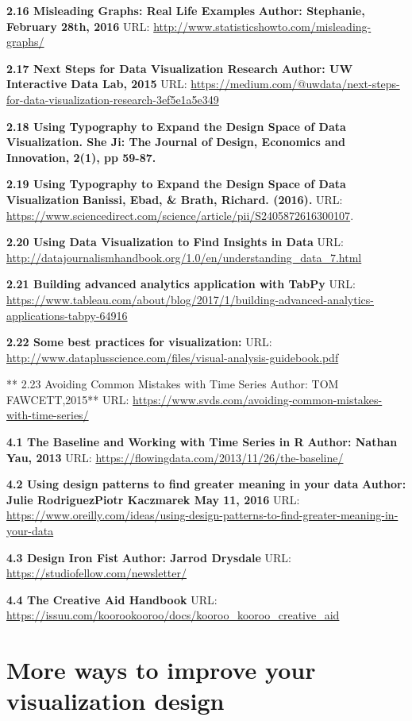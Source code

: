 \documentclass[]{book}
\theoremstyle{definition}
\theoremstyle{definition}
\theoremstyle{definition}
\theoremstyle{remark}
\begin{document}
\textbf{2.16 Misleading Graphs: Real Life Examples} \textbf{Author:
Stephanie, February 28th, 2016} URL:
\url{http://www.statisticshowto.com/misleading-graphs/}

\textbf{2.17 Next Steps for Data Visualization Research} \textbf{Author:
UW Interactive Data Lab, 2015} URL:
\url{https://medium.com/@uwdata/next-steps-for-data-visualization-research-3ef5e1a5e349}

\textbf{2.18 Using Typography to Expand the Design Space of Data
Visualization. She Ji: The Journal of Design, Economics and Innovation,
2(1), pp 59-87.}

\textbf{2.19 Using Typography to Expand the Design Space of Data
Visualization} \textbf{Banissi, Ebad, \& Brath, Richard. (2016). } URL:
\url{https://www.sciencedirect.com/science/article/pii/S2405872616300107}.

\textbf{2.20 Using Data Visualization to Find Insights in Data} URL:
\url{http://datajournalismhandbook.org/1.0/en/understanding_data_7.html}

\textbf{2.21 Building advanced analytics application with TabPy} URL:
\url{https://www.tableau.com/about/blog/2017/1/building-advanced-analytics-applications-tabpy-64916}

\textbf{2.22 Some best practices for visualization:} URL:
\url{http://www.dataplusscience.com/files/visual-analysis-guidebook.pdf}

** 2.23 Avoiding Common Mistakes with Time Series\textbf{ }Author: TOM
FAWCETT,2015** URL:
\url{https://www.svds.com/avoiding-common-mistakes-with-time-series/}

\textbf{4.1 The Baseline and Working with Time Series in R}
\textbf{Author: Nathan Yau, 2013} URL:
\url{https://flowingdata.com/2013/11/26/the-baseline/}

\textbf{4.2 Using design patterns to find greater meaning in your data}
\textbf{Author: Julie RodriguezPiotr Kaczmarek May 11, 2016} URL:
\url{https://www.oreilly.com/ideas/using-design-patterns-to-find-greater-meaning-in-your-data}

\textbf{4.3 Design Iron Fist} \textbf{Author: Jarrod Drysdale} URL:
\url{https://studiofellow.com/newsletter/}

\textbf{4.4 The Creative Aid Handbook} URL:
\url{https://issuu.com/koorookooroo/docs/kooroo_kooroo_creative_aid}

\section{More ways to improve your visualization
design}\label{more-ways-to-improve-your-visualization-design}
\end{document}
